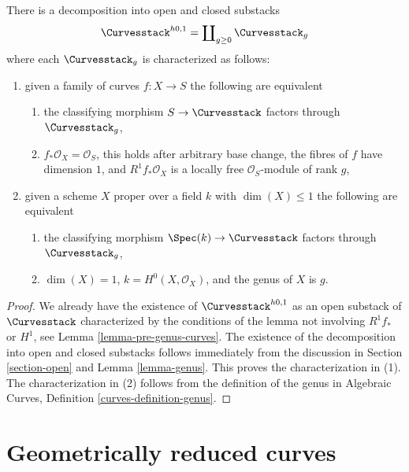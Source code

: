 \begin{lemma}
\label{lemma-pre-genus-one-piece-per-genus}
There is a decomposition into open and closed substacks
$$
\Curvesstack^{h0, 1} = \coprod\nolimits_{g \geq 0} \Curvesstack_g
$$
where each $\Curvesstack_g$ is characterized as follows:
\begin{enumerate}
\item given a family of curves $f : X \to S$ the following are equivalent
\begin{enumerate}
\item the classifying morphism $S \to \Curvesstack$ factors
through $\Curvesstack_g$,
\item $f_*\mathcal{O}_X = \mathcal{O}_S$, this holds after
arbitrary base change, the fibres of $f$ have dimension $1$, and
$R^1f_*\mathcal{O}_X$ is a locally free $\mathcal{O}_S$-module of rank $g$,
\end{enumerate}
\item given a scheme $X$ proper over a field $k$ with $\dim(X) \leq 1$
the following are equivalent
\begin{enumerate}
\item the classifying morphism $\Spec(k) \to \Curvesstack$ factors
through $\Curvesstack_g$,
\item $\dim(X) = 1$, $k = H^0(X, \mathcal{O}_X)$, and
the genus of $X$ is $g$.
\end{enumerate}
\end{enumerate}
\end{lemma}

\begin{proof}
We already have the existence of $\Curvesstack^{h0, 1}$ as an open
substack of $\Curvesstack$ characterized by the conditions of the
lemma not involving $R^1f_*$ or $H^1$, see Lemma \ref{lemma-pre-genus-curves}.
The existence of the decomposition into open and closed substacks
follows immediately from the discussion in Section \ref{section-open}
and Lemma \ref{lemma-genus}. This proves the characterization in (1).
The characterization in (2) follows from the definition of the
genus in Algebraic Curves, Definition \ref{curves-definition-genus}.
\end{proof}









\section{Geometrically reduced curves}
\label{section-geometrically-reduced}


